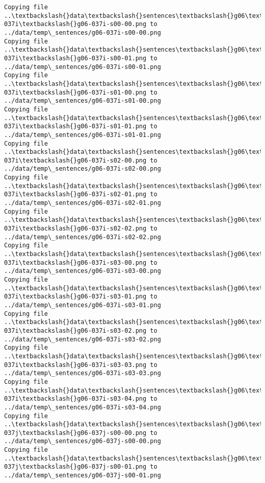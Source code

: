 \documentclass[11pt]{article}
\begin{document}
\begin{Verbatim}[commandchars=\\\{\}]
Copying file ..\textbackslash{}data\textbackslash{}sentences\textbackslash{}g06\textbackslash{}g06-037i\textbackslash{}g06-037i-s00-00.png to
../data/temp\_sentences/g06-037i-s00-00.png
Copying file ..\textbackslash{}data\textbackslash{}sentences\textbackslash{}g06\textbackslash{}g06-037i\textbackslash{}g06-037i-s00-01.png to
../data/temp\_sentences/g06-037i-s00-01.png
Copying file ..\textbackslash{}data\textbackslash{}sentences\textbackslash{}g06\textbackslash{}g06-037i\textbackslash{}g06-037i-s01-00.png to
../data/temp\_sentences/g06-037i-s01-00.png
Copying file ..\textbackslash{}data\textbackslash{}sentences\textbackslash{}g06\textbackslash{}g06-037i\textbackslash{}g06-037i-s01-01.png to
../data/temp\_sentences/g06-037i-s01-01.png
Copying file ..\textbackslash{}data\textbackslash{}sentences\textbackslash{}g06\textbackslash{}g06-037i\textbackslash{}g06-037i-s02-00.png to
../data/temp\_sentences/g06-037i-s02-00.png
Copying file ..\textbackslash{}data\textbackslash{}sentences\textbackslash{}g06\textbackslash{}g06-037i\textbackslash{}g06-037i-s02-01.png to
../data/temp\_sentences/g06-037i-s02-01.png
Copying file ..\textbackslash{}data\textbackslash{}sentences\textbackslash{}g06\textbackslash{}g06-037i\textbackslash{}g06-037i-s02-02.png to
../data/temp\_sentences/g06-037i-s02-02.png
Copying file ..\textbackslash{}data\textbackslash{}sentences\textbackslash{}g06\textbackslash{}g06-037i\textbackslash{}g06-037i-s03-00.png to
../data/temp\_sentences/g06-037i-s03-00.png
Copying file ..\textbackslash{}data\textbackslash{}sentences\textbackslash{}g06\textbackslash{}g06-037i\textbackslash{}g06-037i-s03-01.png to
../data/temp\_sentences/g06-037i-s03-01.png
Copying file ..\textbackslash{}data\textbackslash{}sentences\textbackslash{}g06\textbackslash{}g06-037i\textbackslash{}g06-037i-s03-02.png to
../data/temp\_sentences/g06-037i-s03-02.png
Copying file ..\textbackslash{}data\textbackslash{}sentences\textbackslash{}g06\textbackslash{}g06-037i\textbackslash{}g06-037i-s03-03.png to
../data/temp\_sentences/g06-037i-s03-03.png
Copying file ..\textbackslash{}data\textbackslash{}sentences\textbackslash{}g06\textbackslash{}g06-037i\textbackslash{}g06-037i-s03-04.png to
../data/temp\_sentences/g06-037i-s03-04.png
Copying file ..\textbackslash{}data\textbackslash{}sentences\textbackslash{}g06\textbackslash{}g06-037j\textbackslash{}g06-037j-s00-00.png to
../data/temp\_sentences/g06-037j-s00-00.png
Copying file ..\textbackslash{}data\textbackslash{}sentences\textbackslash{}g06\textbackslash{}g06-037j\textbackslash{}g06-037j-s00-01.png to
../data/temp\_sentences/g06-037j-s00-01.png

\end{Verbatim}
\end{document}
